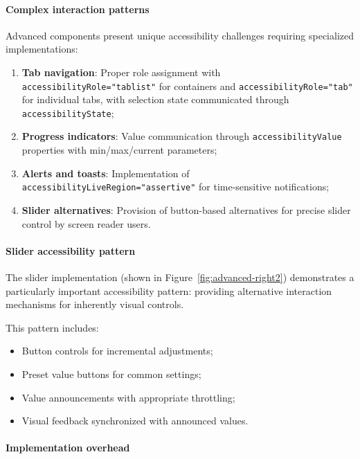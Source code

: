 \paragraph{Complex interaction patterns}

Advanced components present unique accessibility challenges requiring specialized implementations:

\begin{enumerate}
    \item \textbf{Tab navigation}: Proper role assignment with \texttt{accessibilityRole="tablist"} for containers and \texttt{accessibilityRole="tab"} for individual tabs, with selection state communicated through \texttt{accessibilityState};
    
    \item \textbf{Progress indicators}: Value communication through \texttt{accessibilityValue} properties with min/max/current parameters;
    
    \item \textbf{Alerts and toasts}: Implementation of \texttt{accessibilityLiveRegion="assertive"} for time-sensitive notifications;
    
    \item \textbf{Slider alternatives}: Provision of button-based alternatives for precise slider control by screen reader users.
\end{enumerate}

\paragraph{Slider accessibility pattern}

The slider implementation (shown in Figure~\ref{fig:advanced-right2}) demonstrates a particularly important accessibility pattern: providing alternative interaction mechanisms for inherently visual controls.

This pattern includes:

\begin{itemize}
    \item Button controls for incremental adjustments;
    \item Preset value buttons for common settings;
    \item Value announcements with appropriate throttling;
    \item Visual feedback synchronized with announced values.
\end{itemize}

\paragraph{Implementation overhead}

